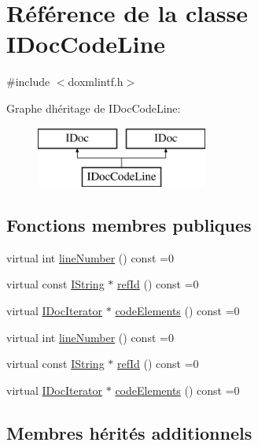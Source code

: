 \hypertarget{class_i_doc_code_line}{}\section{Référence de la classe I\+Doc\+Code\+Line}
\label{class_i_doc_code_line}


{\ttfamily \#include $<$doxmlintf.\+h$>$}

Graphe d\textquotesingle{}héritage de I\+Doc\+Code\+Line\+:\begin{figure}[H]
\begin{center}
\leavevmode
\includegraphics[height=2.000000cm]{class_i_doc_code_line}
\end{center}
\end{figure}
\subsection*{Fonctions membres publiques}
\begin{DoxyCompactItemize}
\item 
virtual int \hyperlink{class_i_doc_code_line_a528e416f224e5738c69114e0978b11b9}{line\+Number} () const  =0
\item 
virtual const \hyperlink{class_i_string}{I\+String} $\ast$ \hyperlink{class_i_doc_code_line_aa3b3a5cbf6d70f0567c459f106405d62}{ref\+Id} () const  =0
\item 
virtual \hyperlink{class_i_doc_iterator}{I\+Doc\+Iterator} $\ast$ \hyperlink{class_i_doc_code_line_af246d0ddcfbe04f407cdf665c5370e6b}{code\+Elements} () const  =0
\item 
virtual int \hyperlink{class_i_doc_code_line_a528e416f224e5738c69114e0978b11b9}{line\+Number} () const  =0
\item 
virtual const \hyperlink{class_i_string}{I\+String} $\ast$ \hyperlink{class_i_doc_code_line_aa3b3a5cbf6d70f0567c459f106405d62}{ref\+Id} () const  =0
\item 
virtual \hyperlink{class_i_doc_iterator}{I\+Doc\+Iterator} $\ast$ \hyperlink{class_i_doc_code_line_af246d0ddcfbe04f407cdf665c5370e6b}{code\+Elements} () const  =0
\end{DoxyCompactItemize}
\subsection*{Membres hérités additionnels}


